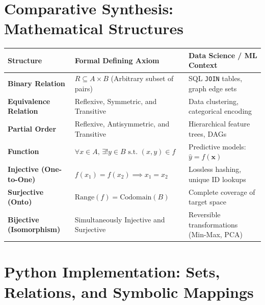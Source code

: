\section{Comparative Synthesis: Mathematical Structures}

\begin{center}
\renewcommand{\arraystretch}{1.3}
\begin{tabular}{p{3.2cm}p{4.2cm}p{4.0cm}}
\toprule
\textbf{Structure} & \textbf{Formal Defining Axiom} & \textbf{Data Science / ML Context} \\
\midrule
\textbf{Binary Relation} & $R \subseteq A \times B$ (Arbitrary subset of pairs) & SQL \texttt{JOIN} tables, graph edge sets \\
\textbf{Equivalence Relation} & Reflexive, Symmetric, and Transitive & Data clustering, categorical encoding \\
\textbf{Partial Order} & Reflexive, Antisymmetric, and Transitive & Hierarchical feature trees, DAGs \\
\textbf{Function} & $\forall x \in A, \, \exists! y \in B \text{ s.t. } (x, y) \in f$ & Predictive models: $\hat{y} = f(\mathbf{x})$ \\
\textbf{Injective (One-to-One)} & $f(x_1) = f(x_2) \implies x_1 = x_2$ & Lossless hashing, unique ID lookups \\
\textbf{Surjective (Onto)} & $\text{Range}(f) = \text{Codomain}(B)$ & Complete coverage of target space \\
\textbf{Bijective (Isomorphism)} & Simultaneously Injective and Surjective & Reversible transformations (Min-Max, PCA) \\
\bottomrule
\end{tabular}
\end{center}

\section{Python Implementation: Sets, Relations, and Symbolic Mappings}

